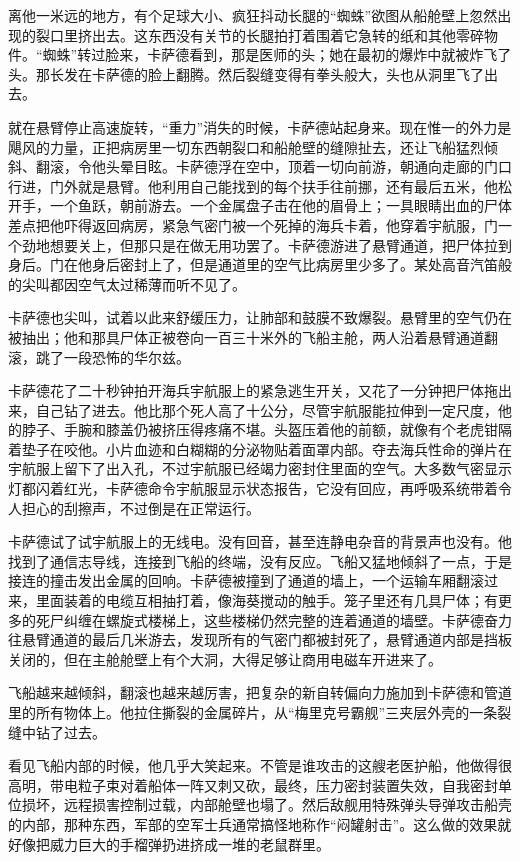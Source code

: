 \documentclass[AutoFakeBold=true]{book}
\begin{document}
离他一米远的地方，有个足球大小、疯狂抖动长腿的``蜘蛛''欲图从船舱壁上忽然出现的裂口里挤出去。这东西没有关节的长腿拍打着围着它急转的纸和其他零碎物件。``蜘蛛''转过脸来，卡萨德看到，那是医师的头；她在最初的爆炸中就被炸飞了头。那长发在卡萨德的脸上翻腾。然后裂缝变得有拳头般大，头也从洞里飞了出去。

就在悬臂停止高速旋转，``重力''消失的时候，卡萨德站起身来。现在惟一的外力是飓风的力量，正把病房里一切东西朝裂口和船舱壁的缝隙扯去，还让飞船猛烈倾斜、翻滚，令他头晕目眩。卡萨德浮在空中，顶着一切向前游，朝通向走廊的门口行进，门外就是悬臂。他利用自己能找到的每个扶手往前挪，还有最后五米，他松开手，一个鱼跃，朝前游去。一个金属盘子击在他的眉骨上；一具眼睛出血的尸体差点把他吓得返回病房，紧急气密门被一个死掉的海兵卡着，他穿着宇航服，门一个劲地想要关上，但那只是在做无用功罢了。卡萨德游进了悬臂通道，把尸体拉到身后。门在他身后密封上了，但是通道里的空气比病房里少多了。某处高音汽笛般的尖叫都因空气太过稀薄而听不见了。

卡萨德也尖叫，试着以此来舒缓压力，让肺部和鼓膜不致爆裂。悬臂里的空气仍在被抽出；他和那具尸体正被卷向一百三十米外的飞船主舱，两人沿着悬臂通道翻滚，跳了一段恐怖的华尔兹。

卡萨德花了二十秒钟拍开海兵宇航服上的紧急逃生开关，又花了一分钟把尸体拖出来，自己钻了进去。他比那个死人高了十公分，尽管宇航服能拉伸到一定尺度，他的脖子、手腕和膝盖仍被挤压得疼痛不堪。头盔压着他的前额，就像有个老虎钳隔着垫子在咬他。小片血迹和白糊糊的分泌物贴着面罩内部。夺去海兵性命的弹片在宇航服上留下了出入孔，不过宇航服已经竭力密封住里面的空气。大多数气密显示灯都闪着红光，卡萨德命令宇航服显示状态报告，它没有回应，再呼吸系统带着令人担心的刮擦声，不过倒是在正常运行。

卡萨德试了试宇航服上的无线电。没有回音，甚至连静电杂音的背景声也没有。他找到了通信志导线，连接到飞船的终端，没有反应。飞船又猛地倾斜了一点，于是接连的撞击发出金属的回响。卡萨德被撞到了通道的墙上，一个运输车厢翻滚过来，里面装着的电缆互相抽打着，像海葵搅动的触手。笼子里还有几具尸体；有更多的死尸纠缠在螺旋式楼梯上，这些楼梯仍然完整的连着通道的墙壁。卡萨德奋力往悬臂通道的最后几米游去，发现所有的气密门都被封死了，悬臂通道内部是挡板关闭的，但在主舱舱壁上有个大洞，大得足够让商用电磁车开进来了。

飞船越来越倾斜，翻滚也越来越厉害，把复杂的新自转偏向力施加到卡萨德和管道里的所有物体上。他拉住撕裂的金属碎片，从``梅里克号霸舰''三夹层外壳的一条裂缝中钻了过去。

看见飞船内部的时候，他几乎大笑起来。不管是谁攻击的这艘老医护船，他做得很高明，带电粒子束对着船体一阵又刺又砍，最终，压力密封装置失效，自我密封单位损坏，远程损害控制过载，内部舱壁也塌了。然后敌舰用特殊弹头导弹攻击船壳的内部，那种东西，军部的空军士兵通常搞怪地称作``闷罐射击''。这么做的效果就好像把威力巨大的手榴弹扔进挤成一堆的老鼠群里。
\end{document}
